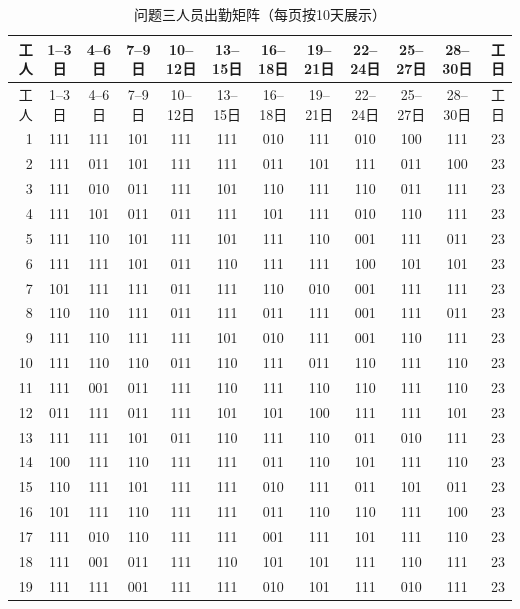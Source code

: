\begin{longtable}{r*{10}{c}r}
\caption{问题三人员出勤矩阵（每页按10天展示）}\label{tab:roster-detail}\\
\toprule 工人 & 1--3日 & 4--6日 & 7--9日 & 10--12日 & 13--15日 & 16--18日 & 19--21日 & 22--24日 & 25--27日 & 28--30日 & 工日\\\midrule
\endfirsthead\toprule 工人 & 1--3日 & 4--6日 & 7--9日 & 10--12日 & 13--15日 & 16--18日 & 19--21日 & 22--24日 & 25--27日 & 28--30日 & 工日\\\midrule\endhead
1 & 111 & 111 & 101 & 111 & 111 & 010 & 111 & 010 & 100 & 111 & 23\\
2 & 111 & 011 & 101 & 111 & 111 & 011 & 101 & 111 & 011 & 100 & 23\\
3 & 111 & 010 & 011 & 111 & 101 & 110 & 111 & 110 & 011 & 111 & 23\\
4 & 111 & 101 & 011 & 011 & 111 & 101 & 111 & 010 & 110 & 111 & 23\\
5 & 111 & 110 & 101 & 111 & 101 & 111 & 110 & 001 & 111 & 011 & 23\\
6 & 111 & 111 & 101 & 011 & 110 & 111 & 111 & 100 & 101 & 101 & 23\\
7 & 101 & 111 & 111 & 011 & 111 & 110 & 010 & 001 & 111 & 111 & 23\\
8 & 110 & 110 & 111 & 011 & 111 & 011 & 111 & 001 & 111 & 011 & 23\\
9 & 111 & 110 & 111 & 111 & 101 & 010 & 111 & 001 & 110 & 111 & 23\\
10 & 111 & 110 & 110 & 011 & 110 & 111 & 011 & 110 & 111 & 110 & 23\\
11 & 111 & 001 & 011 & 111 & 110 & 111 & 110 & 110 & 111 & 110 & 23\\
12 & 011 & 111 & 011 & 111 & 101 & 101 & 100 & 111 & 111 & 101 & 23\\
13 & 111 & 111 & 101 & 011 & 110 & 111 & 110 & 011 & 010 & 111 & 23\\
14 & 100 & 111 & 110 & 111 & 111 & 011 & 110 & 101 & 111 & 110 & 23\\
15 & 110 & 111 & 101 & 111 & 111 & 010 & 111 & 011 & 101 & 011 & 23\\
16 & 101 & 111 & 110 & 111 & 111 & 011 & 110 & 110 & 111 & 100 & 23\\
17 & 111 & 010 & 110 & 111 & 111 & 001 & 111 & 101 & 111 & 110 & 23\\
18 & 111 & 001 & 011 & 111 & 110 & 101 & 101 & 111 & 110 & 111 & 23\\
19 & 111 & 111 & 001 & 111 & 111 & 010 & 101 & 111 & 010 & 111 & 23\\

\end{longtable}
